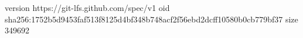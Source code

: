 version https://git-lfs.github.com/spec/v1
oid sha256:1752b5d9453faf513f8125d4bf348b748acf2f56ebd2dcff10580b0cb779bf37
size 349692

